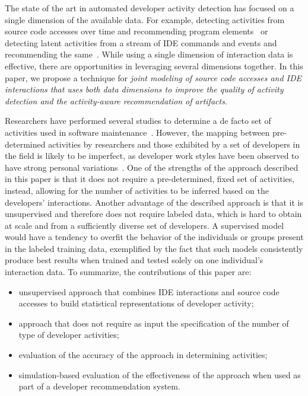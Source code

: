 The state of the art in automated developer activity detection has focused on a single dimension of the available data. For example, detecting
activities from source code accesses over time and recommending program elements~\cite{kevic} or detecting latent activities from a stream of IDE commands and events and recommending the same~\cite{murphy-hill_improving_2012,predicting_damevski_2018}. While using a single dimension of interaction data is effective, there are opportunities
in leveraging several dimensions together. In this paper, we propose a technique for {\em joint modeling
of source code accesses and IDE interactions that uses both data dimensions to improve the quality of activity
detection and the activity-aware recommendation of artifacts}.

Researchers have performed several studies to determine a de facto set of activities used in software
maintenance~\cite{kevic,meyer2017work,amann,latoza}. However, the mapping between pre-determined activities by
researchers and those exhibited by a set of developers in the field is likely to be imperfect, as developer work
styles have been observed to have strong personal variations~\cite{kevic,meyer2017work}. One of the strengths of the
approach described in this paper is that it does not require a pre-determined, fixed set of activities, instead, allowing for the number of activities to be inferred based on the developers' interactions.
Another advantage of the described approach is that it is unsupervised and therefore does not require labeled data, which is hard to obtain at scale and from a sufficiently diverse set of developers. A supervised model would have
a tendency to overfit the behavior of the individuals or groups present in the labeled training data, exemplified by the fact that such models consistently produce best results when trained and tested solely on one individual's interaction data. To summarize, the contributions of this paper are:

\begin{itemize}
\item unsupervised approach that combines IDE interactions and source code accesses to build statistical representations of developer activity;
\item approach that does not require as input the specification of the number of type of developer activities;
\item evaluation of the accuracy of the approach in determining activities;
\item simulation-based evaluation of the effectiveness of the approach when used as part of a developer recommendation system.
\end{itemize}

